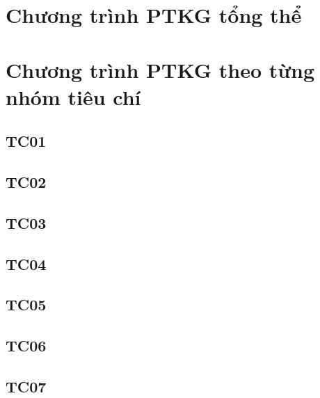\documentclass[../thesis.tex]{subfiles}
\begin{document}
\section {Chương trình PTKG tổng thể}
\section {Chương trình PTKG theo từng nhóm tiêu chí}
\subsection {TC01}
\subsection {TC02}
\subsection {TC03}
\subsection {TC04}
\subsection {TC05}
\subsection {TC06}
\subsection {TC07}
\end{document}
